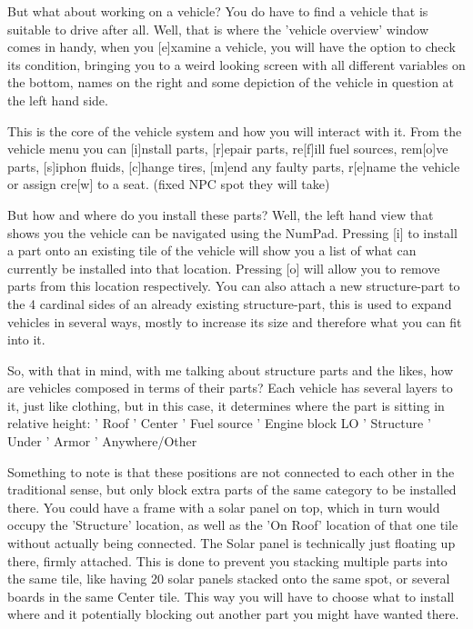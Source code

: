 But what about working on a vehicle? You do have to find a vehicle that is suitable to drive after all. Well, that is where the 'vehicle overview' window comes in handy, when you [e]xamine a vehicle, you will have the option to check its condition, bringing you to a weird looking screen with all different variables on the bottom, names on the right and some depiction of the vehicle in question at the left hand side.

This is the core of the vehicle system and how you will interact with it.
From the vehicle menu you can [i]nstall parts, [r]epair parts, re[f]ill fuel sources, rem[o]ve parts, [s]iphon fluids, [c]hange tires, [m]end any faulty parts, r[e]name the vehicle or assign cre[w] to a seat. (fixed NPC spot they will take)

But how and where do you install these parts? Well, the left hand view that shows you the vehicle can be navigated using the NumPad. Pressing [i] to install a part onto an existing tile of the vehicle will show you a list of what can currently be installed into that location. Pressing [o] will allow you to remove parts from this location respectively. You can also attach a new structure-part to the 4 cardinal sides of an already existing structure-part, this is used to expand vehicles in several ways, mostly to increase its size and therefore what you can fit into it.

So, with that in mind, with me talking about structure parts and the likes, how are vehicles composed in terms of their parts? Each vehicle has several layers to it, just like clothing, but in this case, it determines where the part is sitting in relative height:
    ' Roof
    ' Center
    ' Fuel source
    ' Engine block LO
    ' Structure
    ' Under
    ' Armor
    ' Anywhere/Other

Something to note is that these positions are not connected to each other in the traditional sense, but only block extra parts of the same category to be installed there. You could have a frame with a solar panel on top, which in turn would occupy the 'Structure' location, as well as the 'On Roof' location of that one tile without actually being connected. The Solar panel is technically just floating up there, firmly attached. This is done to prevent you stacking multiple parts into the same tile, like having 20 solar panels stacked onto the same spot, or several boards in the same Center tile. This way you will have to choose what to install where and it potentially blocking out another part you might have wanted there.

